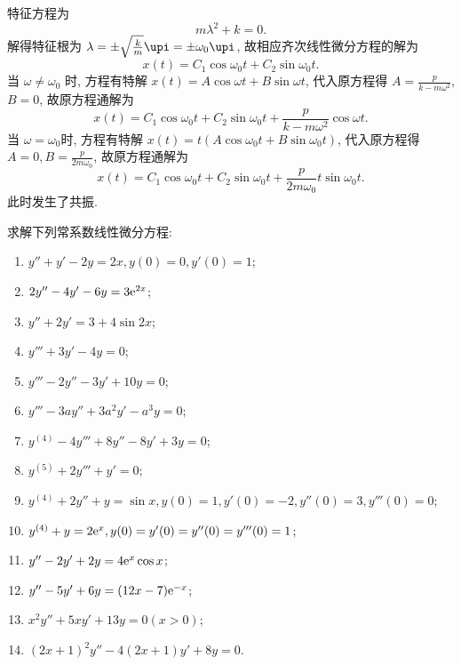 \begin{solution}
  特征方程为
  \[m\lambda^2+k=0.\]
  解得特征根为 $\lambda=\pm\sqrt{\frac{k}{m}}\upi=\pm\omega_0\upi$, 故相应齐次线性微分方程的解为
  \[x(t)=C_1\cos\omega_0t+C_2\sin\omega_0t.\]
  当 $\omega\neq\omega_0$ 时, 方程有特解 $x(t)=A\cos\omega t+B\sin\omega t$, 
  代入原方程得 $A=\frac{p}{k-m\omega^2}$, $B=0$, 故原方程通解为
  \[x(t)=C_1\cos\omega_0t+C_2\sin\omega_0t+\frac{p}{k-m\omega^2}\cos\omega t.\]
  当 $\omega=\omega_0$时, 方程有特解 $x(t)=t(A\cos\omega_0t+B\sin\omega_0t)$,
  代入原方程得 $A=0,B=\frac{p}{2m\omega_0}$, 故原方程通解为
  \[x(t)=C_1\cos\omega_0t+C_2\sin\omega_0t+\frac{p}{2m\omega_0}t\sin\omega_0 t.\]
  此时发生了共振.
\end{solution}



\begin{exercise}
  求解下列常系数线性微分方程:
  \begin{enumerate}[(1)]
  \item $y''+y'-2y=2x,y(0)=0,y'(0)=1$;
  \item $2y''-4y'-6y=3\mathrm{e}^{2x}$;
  \item $y''+2y'=3+4\sin 2x$;
  \item $y'''+3y'-4y=0$;
  \item $y'''-2y''-3y'+10y=0$;
  \item $y'''-3ay''+3a^2y'-a^3y=0$;
  \item $y^{(4)}-4y'''+8y''-8y'+3y=0$;
  \item $y^{(5)}+2y'''+y'=0$;
  \item $y^{(4)}+2y''+y=\sin x,y(0)=1,y'(0)=-2,y''(0)=3,y'''(0)=0$;
  \item $y^{(4)}+y=2\mathrm{e}^x,y(0)=y'(0)=y''(0)=y'''(0)=1$;
  \item $y''-2y'+2y=4\mathrm{e}^x\cos x$;
  \item $y''-5y'+6y=(12x-7)\mathrm{e}^{-x}$;
  \item $x^2y''+5xy'+13y=0(x>0)$;
  \item $(2x+1)^2y''-4(2x+1)y'+8y=0$.
  \end{enumerate}
\end{exercise}

